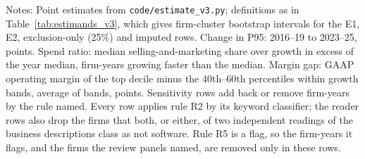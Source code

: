 \begin{table}[t]
\par\vspace{2pt}\footnotesize\raggedright Notes: Point estimates from \texttt{code/estimate\_v3.py}; definitions as in Table~\ref{tab:estimands_v3}, which gives firm-cluster bootstrap intervals for the E1, E2, exclusion-only (25\%) and imputed rows. Change in P95: 2016--19 to 2023--25, points. Spend ratio: median selling-and-marketing share over growth in excess of the year median, firm-years growing faster than the median. Margin gap: GAAP operating margin of the top decile minus the 40th--60th percentiles within growth bands, average of bands, points. Sensitivity rows add back or remove firm-years by the rule named. Every row applies rule R2 by its keyword classifier; the reader rows also drop the firms that both, or either, of two independent readings of the business descriptions class as not software. Rule R5 is a flag, so the firm-years it flags, and the firms the review panels named, are removed only in these rows.
\end{table}
